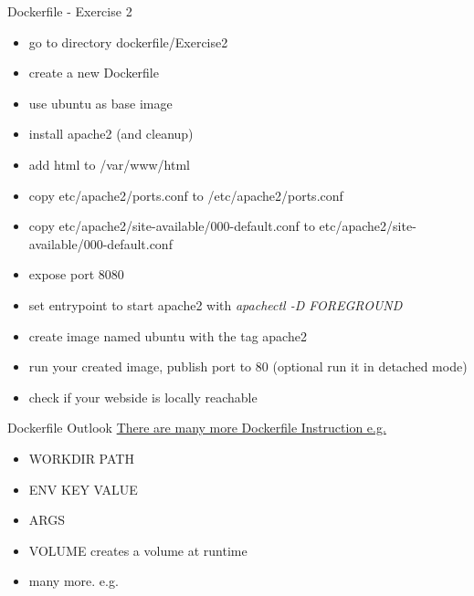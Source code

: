 \documentclass[10pt,aspectratio=\ratio,
compress
]{beamer}
\begin{document}
\begin{frame}{Dockerfile - Exercise 2}
\begin{itemize}
	\item go to directory dockerfile/Exercise2
	\item create a new Dockerfile
	\item use ubuntu as base image
	\item install apache2 (and cleanup)
	\item add html to /var/www/html
	\item copy etc/apache2/ports.conf to /etc/apache2/ports.conf
	\item copy etc/apache2/site-available/000-default.conf to etc/apache2/site-available/000-default.conf
	\item expose port 8080
	\item set entrypoint to start apache2 with \emph{apachectl -D FOREGROUND}
	\item create image named ubuntu with the tag apache2
	\item run your created image, publish port to 80 (optional run it in detached mode)
	\item check if your webside is locally reachable
\end{itemize}
\end{frame}

\begin{frame}{Dockerfile Outlook}
\href{https://docs.docker.com/engine/reference/builder/}{There are many more Dockerfile Instruction e.g.}
\begin{itemize}
	\item WORKDIR PATH 
	\item ENV KEY VALUE
	\item ARGS
	\item VOLUME creates a volume at runtime
	\item many more. e.g.
\end{itemize}
\end{frame}
\end{document}
